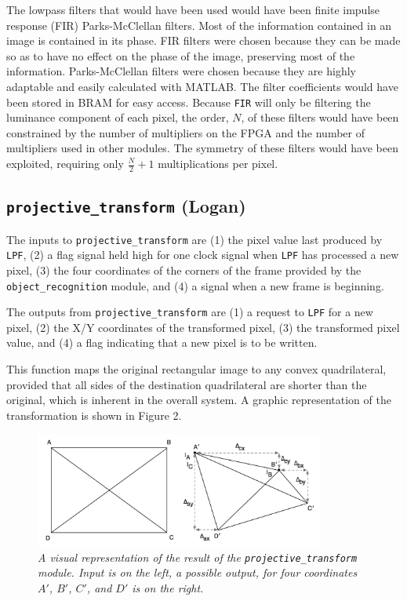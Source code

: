\documentclass[10pt]{article}
\begin{document}
The lowpass filters that would have been used would have been finite impulse response (FIR) Parks-McClellan filters. Most of the information contained in an image is contained in its phase. FIR filters were chosen because they can be made so as to have no effect on the phase of the image, preserving most of the information. Parks-McClellan filters were chosen because they are highly adaptable and easily calculated with MATLAB. The filter coefficients would have been stored in BRAM for easy access. Because {\tt FIR} will only be filtering the luminance component of each pixel, the order, \( N \), of these filters would have been constrained by the number of multipliers on the FPGA and the number of multipliers used in other modules. The symmetry of these filters would have been exploited, requiring only \( \frac{N}{2}+1 \) multiplications per pixel.

\subsection{{\tt projective\_transform} (Logan)}
The inputs to {\tt projective\_transform} are (1) the pixel value last produced by {\tt LPF}, (2) a flag signal held high for one clock signal when {\tt LPF} has processed a new pixel, (3) the four coordinates of the corners of the frame provided by the {\tt object\_recognition} module, and (4) a signal when a new frame is beginning.

The outputs from {\tt projective\_transform} are (1) a request to {\tt LPF} for a new pixel, (2) the X/Y coordinates of the transformed pixel, (3) the transformed pixel value, and (4) a flag indicating that a new pixel is to be written.

This function maps the original rectangular image to any convex quadrilateral, provided that all sides of the destination quadrilateral are shorter than the original, which is inherent in the overall system. A graphic representation of the transformation is shown in Figure 2.

\begin{figure}[h!]
\centering
\includegraphics[width=0.85\textwidth]{images/arbiskew_graphic.png}
\caption{\emph{A visual representation of the result of the {\tt projective\_transform} module. Input is on the left, a possible output, for four coordinates $A\prime$, $B\prime$, $C\prime$, and $D\prime$ is on the right.}}
\end{figure}
\end{document}
